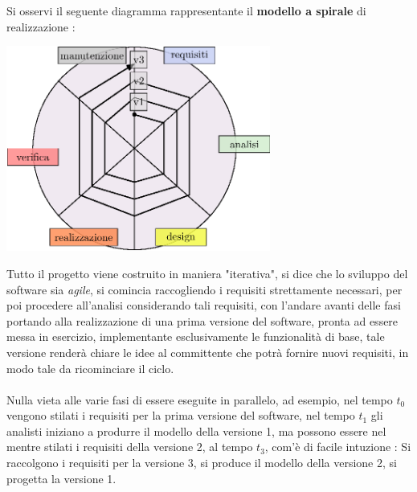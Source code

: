 \documentclass[12pt, letterpaper]{article}
\newcommand{\acc}{\\\hphantom{}\\}
\begin{document}
Si osservi il seguente diagramma rappresentante il \textbf{modello a spirale} di realizzazione : \begin{center}
    \includegraphics[width=0.65\textwidth ]{images/cicloDiVita.eps}
\end{center}
Tutto il progetto viene costruito in maniera "iterativa", si dice che lo sviluppo del software sia 
\textit{agile}, si comincia raccogliendo i requisiti strettamente necessari, per poi procedere all'analisi 
considerando tali requisiti, con l'andare avanti delle fasi portando alla realizzazione di una prima versione 
del software, pronta ad essere messa in esercizio, implementante esclusivamente le funzionalità di base, tale 
versione renderà chiare le idee al committente che potrà fornire nuovi requisiti, in modo tale da ricominciare il ciclo.\acc 
Nulla vieta alle varie fasi di essere eseguite in parallelo, ad esempio, nel tempo \(t_0\) vengono stilati 
i requisiti per la prima versione del software, nel tempo \(t_1\) gli analisti iniziano a produrre il modello della versione 1, ma 
possono essere nel mentre stilati i requisiti della versione 2, al tempo \(t_3\), com'è di facile intuzione : 
 Si raccolgono i requisiti per la versione 3, si produce il modello della versione 2, si progetta la versione 1.
\end{document}
